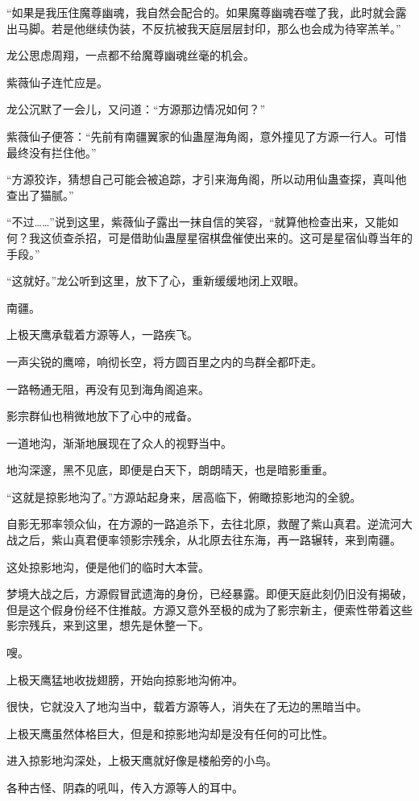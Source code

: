 \begin{this_body}
“如果是我压住魔尊幽魂，我自然会配合的。如果魔尊幽魂吞噬了我，此时就会露出马脚。若是他继续伪装，不反抗被我天庭层层封印，那么也会成为待宰羔羊。”

龙公思虑周翔，一点都不给魔尊幽魂丝毫的机会。

紫薇仙子连忙应是。

龙公沉默了一会儿，又问道：“方源那边情况如何？”

紫薇仙子便答：“先前有南疆翼家的仙蛊屋海角阁，意外撞见了方源一行人。可惜最终没有拦住他。”

“方源狡诈，猜想自己可能会被追踪，才引来海角阁，所以动用仙蛊查探，真叫他查出了猫腻。”

“不过……”说到这里，紫薇仙子露出一抹自信的笑容，“就算他检查出来，又能如何？我这侦查杀招，可是借助仙蛊屋星宿棋盘催使出来的。这可是星宿仙尊当年的手段。”

“这就好。”龙公听到这里，放下了心，重新缓缓地闭上双眼。

南疆。

上极天鹰承载着方源等人，一路疾飞。

一声尖锐的鹰啼，响彻长空，将方圆百里之内的鸟群全都吓走。

一路畅通无阻，再没有见到海角阁追来。

影宗群仙也稍微地放下了心中的戒备。

一道地沟，渐渐地展现在了众人的视野当中。

地沟深邃，黑不见底，即便是白天下，朗朗晴天，也是暗影重重。

“这就是掠影地沟了。”方源站起身来，居高临下，俯瞰掠影地沟的全貌。

自影无邪率领众仙，在方源的一路追杀下，去往北原，救醒了紫山真君。逆流河大战之后，紫山真君便率领影宗残余，从北原去往东海，再一路辗转，来到南疆。

这处掠影地沟，便是他们的临时大本营。

梦境大战之后，方源假冒武遗海的身份，已经暴露。即便天庭此刻仍旧没有揭破，但是这个假身份经不住推敲。方源又意外至极的成为了影宗新主，便索性带着这些影宗残兵，来到这里，想先是休整一下。

嗖。

上极天鹰猛地收拢翅膀，开始向掠影地沟俯冲。

很快，它就没入了地沟当中，载着方源等人，消失在了无边的黑暗当中。

上极天鹰虽然体格巨大，但是和掠影地沟却是没有任何的可比性。

进入掠影地沟深处，上极天鹰就好像是楼船旁的小鸟。

各种古怪、阴森的吼叫，传入方源等人的耳中。


\end{this_body}
